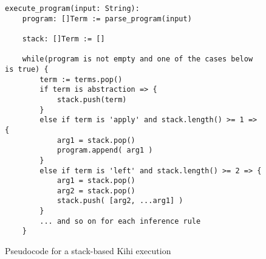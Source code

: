 \begin{figure}[!htb]
    \centering
    \begin{lstlisting}
execute_program(input: String):
    program: []Term := parse_program(input)
    
    stack: []Term := []
    
    while(program is not empty and one of the cases below is true) {
        term := terms.pop()
        if term is abstraction => {
            stack.push(term)
        }
        else if term is 'apply' and stack.length() >= 1 => {
            arg1 = stack.pop()
            program.append( arg1 )
        }
        else if term is 'left' and stack.length() >= 2 => {
            arg1 = stack.pop()
            arg2 = stack.pop()
            stack.push( [arg2, ...arg1] )
        }
        ... and so on for each inference rule
    }
    \end{lstlisting}
    \caption{Pseudocode for a stack-based Kihi execution}
    \label{fig:stack_pseudocode}
\end{figure}
